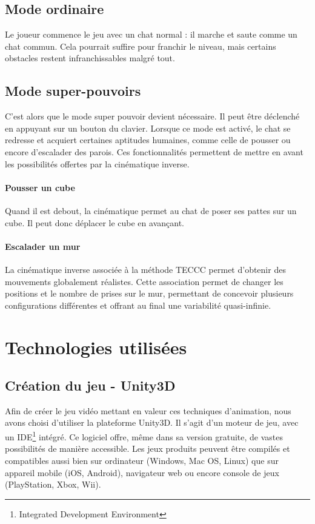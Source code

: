 \documentclass[a4paper,11pt]{article}
\begin{document}
\subsection{Mode ordinaire}
Le joueur commence le jeu avec un chat normal : il marche et saute comme un chat commun. Cela pourrait suffire pour franchir le niveau, mais certains obstacles restent infranchissables malgré tout.

\subsection{Mode super-pouvoirs}
C'est alors que le mode super pouvoir devient nécessaire. Il peut être déclenché en appuyant sur un bouton du clavier. Lorsque ce mode est activé, le chat se redresse et acquiert certaines aptitudes humaines, comme celle de pousser ou encore d'escalader des parois. Ces fonctionnalités permettent de mettre en avant les possibilités offertes par la cinématique inverse.

\paragraph{Pousser un cube}
Quand il est debout, la cinématique permet au chat de poser ses pattes sur un cube. Il peut donc déplacer le cube en avançant.
\paragraph{Escalader un mur}
La cinématique inverse associée à la méthode TECCC permet d'obtenir des mouvements globalement réalistes. Cette association permet de changer les positions et le nombre de prises sur le mur, permettant de concevoir plusieurs configurations différentes et offrant au final une variabilité quasi-infinie.

\section{Technologies utilisées}
\subsection{Création du jeu - Unity3D}

Afin de créer le jeu vidéo mettant en valeur ces techniques d'animation, nous avons choisi d'utiliser la plateforme Unity3D. Il s'agit d'un moteur de jeu, avec un IDE\footnote{Integrated Development Environment} intégré. Ce logiciel offre, même dans sa version gratuite, de vastes possibilités de manière accessible. Les jeux produits peuvent être compilés et compatibles aussi bien sur ordinateur (Windows, Mac OS, Linux) que sur appareil mobile (iOS, Android), navigateur web ou encore console de jeux (PlayStation, Xbox, Wii).
\end{document}
